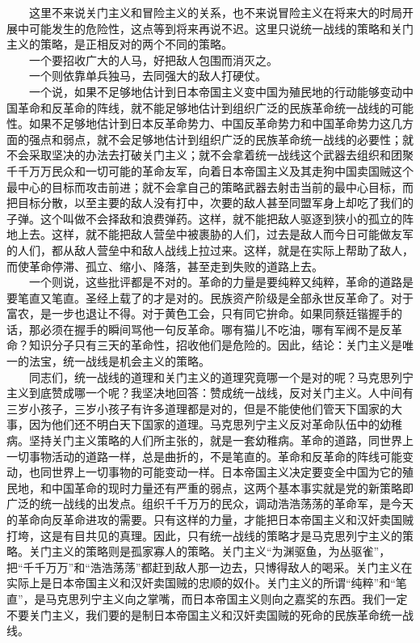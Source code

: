 \documentclass[cn,11pt,chinese]{elegantbook}
\begin{document}
　　这里不来说关门主义和冒险主义的关系，也不来说冒险主义在将来大的时局开展中可能发生的危险性，这点等到将来再说不迟。这里只说统一战线的策略和关门主义的策略，是正相反对的两个不同的策略。\\
　　一个要招收广大的人马，好把敌人包围而消灭之。\\
　　一个则依靠单兵独马，去同强大的敌人打硬仗。\\
　　一个说，如果不足够地估计到日本帝国主义变中国为殖民地的行动能够变动中国革命和反革命的阵线，就不能足够地估计到组织广泛的民族革命统一战线的可能性。如果不足够地估计到日本反革命势力、中国反革命势力和中国革命势力这几方面的强点和弱点，就不会足够地估计到组织广泛的民族革命统一战线的必要性；就不会采取坚决的办法去打破关门主义；就不会拿着统一战线这个武器去组织和团聚千千万万民众和一切可能的革命友军，向着日本帝国主义及其走狗中国卖国贼这个最中心的目标而攻击前进；就不会拿自己的策略武器去射击当前的最中心目标，而把目标分散，以至主要的敌人没有打中，次要的敌人甚至同盟军身上却吃了我们的子弹。这个叫做不会择敌和浪费弹药。这样，就不能把敌人驱逐到狭小的孤立的阵地上去。这样，就不能把敌人营垒中被裹胁的人们，过去是敌人而今日可能做友军的人们，都从敌人营垒中和敌人战线上拉过来。这样，就是在实际上帮助了敌人，而使革命停滞、孤立、缩小、降落，甚至走到失败的道路上去。\\
　　一个则说，这些批评都是不对的。革命的力量是要纯粹又纯粹，革命的道路是要笔直又笔直。圣经上载了的才是对的。民族资产阶级是全部永世反革命了。对于富农，是一步也退让不得。对于黄色工会，只有同它拚命。如果同蔡廷锴握手的话，那必须在握手的瞬间骂他一句反革命。哪有猫儿不吃油，哪有军阀不是反革命？知识分子只有三天的革命性，招收他们是危险的。因此，结论：关门主义是唯一的法宝，统一战线是机会主义的策略。\\
　　同志们，统一战线的道理和关门主义的道理究竟哪一个是对的呢？马克思列宁主义到底赞成哪一个呢？我坚决地回答：赞成统一战线，反对关门主义。人中间有三岁小孩子，三岁小孩子有许多道理都是对的，但是不能使他们管天下国家的大事，因为他们还不明白天下国家的道理。马克思列宁主义反对革命队伍中的幼稚病。坚持关门主义策略的人们所主张的，就是一套幼稚病。革命的道路，同世界上一切事物活动的道路一样，总是曲折的，不是笔直的。革命和反革命的阵线可能变动，也同世界上一切事物的可能变动一样。日本帝国主义决定要变全中国为它的殖民地，和中国革命的现时力量还有严重的弱点，这两个基本事实就是党的新策略即广泛的统一战线的出发点。组织千千万万的民众，调动浩浩荡荡的革命军，是今天的革命向反革命进攻的需要。只有这样的力量，才能把日本帝国主义和汉奸卖国贼打垮，这是有目共见的真理。因此，只有统一战线的策略才是马克思列宁主义的策略。关门主义的策略则是孤家寡人的策略。关门主义“为渊驱鱼，为丛驱雀”，把“千千万万”和“浩浩荡荡”都赶到敌人那一边去，只博得敌人的喝采。关门主义在实际上是日本帝国主义和汉奸卖国贼的忠顺的奴仆。关门主义的所谓“纯粹”和“笔直”，是马克思列宁主义向之掌嘴，而日本帝国主义则向之嘉奖的东西。我们一定不要关门主义，我们要的是制日本帝国主义和汉奸卖国贼的死命的民族革命统一战线。\\
\end{document}
